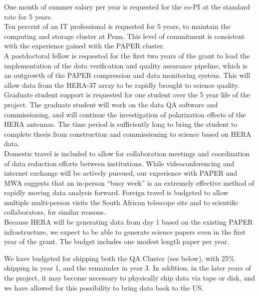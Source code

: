 \documentclass[onecolumn,11pt]{aastex}
\begin{document}
 One month of summer salary per year is requested for the
co-PI at the standard rate for 5 years.\\

 Ten percent of an IT professional is requested for 5 years, to maintain the computing and storage cluster at Penn.  This level of commitment is consistent with the experience gained with the PAPER cluster.\\

 A postdoctoral fellow is requested for the first two years of the grant to lead the implementation of the data verification and quality assurance pipeline, which is an outgrowth of the PAPER compression and data monitoring system.  This will allow data from the HERA-37 array to be rapidly brought to science quality.\\ 

 Graduate student support is requested for
one student over the 5 year life of the project.  The graduate student will work on the data QA software and commissioning, and will continue the investigation of polarization effects of the HERA antennas.  The time period is sufficiently long to bring the student to complete thesis from construction and commissioning to science based on HERA data.  \\

 Domestic travel is included to allow for collaboration meetings and coordination of data reduction efforts between institutions.  While videoconferencing and internet exchange will be actively pursued, our experience with PAPER and MWA suggests that an in-person ``busy week'' is an extremely effective method of rapidly moving data analysis forward.  Foreign travel is budgeted to allow multiple multi-person visits the South African telescope site and to scientific collaborators, for similar reasons.\\

 Because HERA will be generating data from day 1 based on the existing PAPER infrastructure, we expect to be able to generate science papers even in the first year of the grant.  The budget includes one modest length paper per year.

 We have budgeted for shipping both the QA Cluster (see below), with 25\% shipping in year 1, and the remainder in year 3.  In addition, in the later years of the project, it may become necessary to physically ship data via tape or disk, and we have allowed for this possibility to bring data back to the US.
\end{document}
